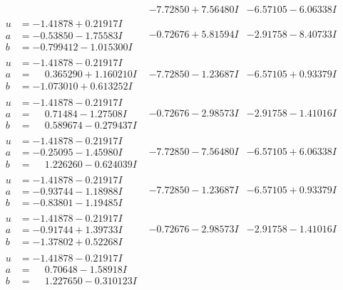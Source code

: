 \documentclass[1p]{elsarticle_modified}
\theoremstyle{definition}
\begin{document}
$$\begin{array}{c|c|c}
 & -7.72850 + 7.56480 I & -6.57105 - 6.06338 I \\ \hline\begin{aligned}
u &= -1.41878 + 0.21917 I \\
a &= -0.53850 - 1.75583 I \\
b &= -0.799412 - 1.015300 I\end{aligned}
 & -0.72676 + 5.81594 I & -2.91758 - 8.40733 I \\ \hline\begin{aligned}
u &= -1.41878 - 0.21917 I \\
a &= \phantom{-}0.365290 + 1.160210 I \\
b &= -1.073010 + 0.613252 I\end{aligned}
 & -7.72850 - 1.23687 I & -6.57105 + 0.93379 I \\ \hline\begin{aligned}
u &= -1.41878 - 0.21917 I \\
a &= \phantom{-}0.71484 - 1.27508 I \\
b &= \phantom{-}0.589674 - 0.279437 I\end{aligned}
 & -0.72676 - 2.98573 I & -2.91758 - 1.41016 I \\ \hline\begin{aligned}
u &= -1.41878 - 0.21917 I \\
a &= -0.25095 - 1.45980 I \\
b &= \phantom{-}1.226260 - 0.624039 I\end{aligned}
 & -7.72850 - 7.56480 I & -6.57105 + 6.06338 I \\ \hline\begin{aligned}
u &= -1.41878 - 0.21917 I \\
a &= -0.93744 - 1.18988 I \\
b &= -0.83801 - 1.19485 I\end{aligned}
 & -7.72850 - 1.23687 I & -6.57105 + 0.93379 I \\ \hline\begin{aligned}
u &= -1.41878 - 0.21917 I \\
a &= -0.91744 + 1.39733 I \\
b &= -1.37802 + 0.52268 I\end{aligned}
 & -0.72676 - 2.98573 I & -2.91758 - 1.41016 I \\ \hline\begin{aligned}
u &= -1.41878 - 0.21917 I \\
a &= \phantom{-}0.70648 - 1.58918 I \\
b &= \phantom{-}1.227650 - 0.310123 I\end{aligned}

\end{array}$$
\end{document}
